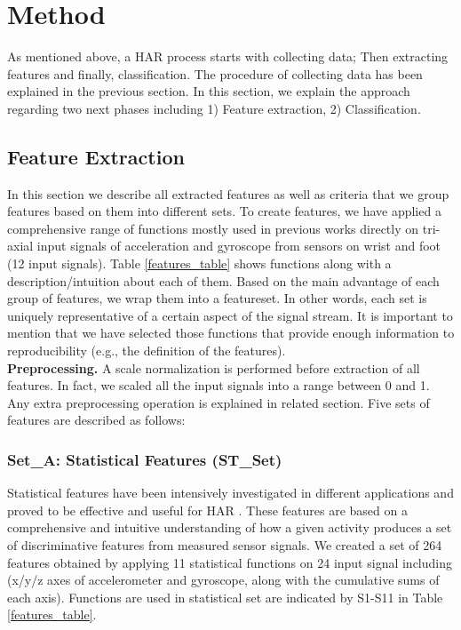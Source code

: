 \documentclass[journal,article,submit,moreauthors,pdftex]{Definitions/mdpi}
\begin{document}
\section{Method}
As mentioned above, a HAR process starts with collecting data; Then extracting features and finally, classification. The procedure of collecting data has been explained in the previous section. In this section, we explain the approach regarding two next phases including 1) Feature extraction, 2) Classification. 

\subsection{Feature Extraction}

In this section we describe all extracted features as well as criteria that we group features based on them into different sets.
To create features, we have applied a comprehensive range of functions mostly used in previous works directly on tri-axial input signals of acceleration and gyroscope from sensors on wrist and foot (12 input signals). Table \ref{features_table} shows functions along with a description/intuition about each of them. Based on the main advantage of each group of features, we wrap them into a featureset. In other words, each set is uniquely representative of a certain aspect of the signal stream. It is important to mention that we have selected those functions that provide enough information to reproducibility (e.g., the definition of the features).\\
\textbf{Preprocessing.} A scale normalization is performed before extraction of all features. In fact, we scaled all the input signals into a range between 0 and 1. Any extra preprocessing operation is explained in related section. Five sets of features are described as follows:

\subsubsection{Set\_A: Statistical Features (ST\_Set)}
Statistical features have been intensively investigated in different applications and proved to be effective and useful for HAR \cite{rosati2018comparison}. These features are based on a comprehensive and intuitive understanding of how a given activity produces a set of discriminative features from measured sensor signals. We created a set of 264 features obtained by applying 11 statistical functions on 24 input signal including (x/y/z axes of accelerometer and gyroscope, along with the cumulative sums of each axis). Functions are used in statistical set are indicated by S1-S11 in Table \ref{features_table}. 
\end{document}
